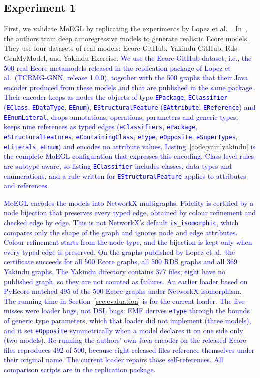 \documentclass[journal,article,submit,moreauthors,technologies]{Definitions/mdpi}
\newcommand{\rev}[1]{\textcolor{blue}{#1}}
\begin{document}
\subsection{Experiment 1}
First, we validate MoEGL by replicating the experiments by Lopez et al.~\cite{lopez2022generating}. In~\cite{lopez2022generating}, the authors train deep autoregressive models to generate realistic Ecore models. They use four datasets of real models: Ecore-GitHub, Yakindu-GitHub, Rds-GenMyModel, and Yakindu-Exercise.
\rev{We use the Ecore-GitHub dataset, i.e., the 500 real Ecore metamodels released in the replication package of Lopez et al.\ (TCRMG-GNN, release 1.0.0), together with the 500 graphs that their Java encoder produced from these models and that are published in the same package. Their encoder keeps as nodes the objects of type \texttt{EPackage}, \texttt{EClassifier} (\texttt{EClass}, \texttt{EDataType}, \texttt{EEnum}), \texttt{EStructuralFeature} (\texttt{EAttribute}, \texttt{EReference}) and \texttt{EEnumLiteral}, drops annotations, operations, parameters and generic types, keeps nine references as typed edges (\texttt{eClassifiers}, \texttt{ePackage}, \texttt{eStructuralFeatures}, \texttt{eContainingClass}, \texttt{eType}, \texttt{eOpposite}, \texttt{eSuperTypes}, \texttt{eLiterals}, \texttt{eEnum}) and encodes no attribute values. Listing~\ref{code:yamlyakindu} is the complete MoEGL configuration that expresses this encoding. Class-level rules are subtype-aware, so listing \texttt{EClassifier} includes classes, data types and enumerations, and a rule written for \texttt{EStructuralFeature} applies to attributes and references.}

\rev{MoEGL encodes the models into NetworkX multigraphs. Fidelity is certified by a node bijection that preserves every typed edge, obtained by colour refinement and checked edge by edge. This is not NetworkX's default \texttt{is\_isomorphic}, which compares only the shape of the graph and ignores node and edge attributes. Colour refinement starts from the node type, and the bijection is kept only when every typed edge is preserved. On the graphs published by Lopez et al.\ the certificate succeeds for all 500 Ecore graphs, all 500 RDS graphs and all 369 Yakindu graphs. The Yakindu directory contains 377 files; eight have no published graph, so they are not counted as failures. An earlier loader based on PyEcore matched 495 of the 500 Ecore graphs under NetworkX isomorphism. The running time in Section~\ref{sec:evaluation} is for the current loader. The five misses were loader bugs, not DSL bugs: EMF derives \texttt{eType} through the bounds of generic type parameters, which that loader did not implement (three models), and it set \texttt{eOpposite} symmetrically when a model declares it on one side only (two models). Re-running the authors' own Java encoder on the released Ecore files reproduces 492 of 500, because eight released files reference themselves under their original name. The current loader repairs those self-references. All comparison scripts are in the replication package.}
\end{document}
